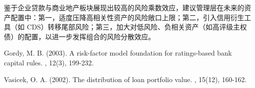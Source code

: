 \documentclass[12pt]{article}
\begin{document}
鉴于企业贷款与商业地产板块展现出较高的风险乘数效应，建议管理层在未来的资产配置中：第一，适度压降高相关性资产的风险敞口上限；第二，引入信用衍生工具（如 CDS）转移尾部风险；第三，加大对低风险、负相关资产（如高评级主权债）的配置，以进一步发挥组合的风险分散效应。


\newpage



\begin{thebibliography}{}

Gordy, M. B. (2003).
\newblock A risk-factor model foundation for ratings-based bank capital rules.
, 12(3), 199-232.

Vasicek, O. A. (2002).
\newblock The distribution of loan portfolio value.
, 15(12), 160-162.

\end{thebibliography}
\end{document}
